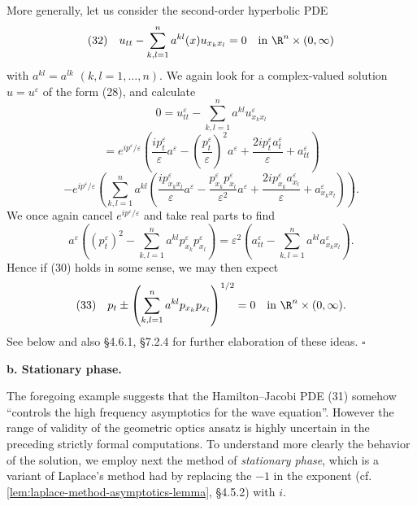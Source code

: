 \begin{example}
More generally, let us consider the second-order hyperbolic PDE
$$(32) \quad u_{tt} - \sum_{k,l=1}^n a^{kl}(x) u_{x_k x_l} = 0 \quad \text{in } \R^n \times (0,\infty)$$
with $a^{kl} = a^{lk}$ $(k, l = 1, \ldots, n)$. We again look for a complex-valued solution $u = u^\varepsilon$ of the form (28), and calculate
$$0 = u_{tt}^\varepsilon - \sum_{k,l=1}^n a^{kl} u_{x_k x_l}^\varepsilon$$
$$= e^{ip^\varepsilon/\varepsilon} \left( \frac{ip_t^\varepsilon}{\varepsilon} a^\varepsilon - \left( \frac{p_t^\varepsilon}{\varepsilon} \right)^2 a^\varepsilon + \frac{2ip_t^\varepsilon a_t^\varepsilon}{\varepsilon} + a_{tt}^\varepsilon \right)$$
$$- e^{ip^\varepsilon/\varepsilon} \left( \sum_{k,l=1}^n a^{kl} \left( \frac{ip_{x_k x_l}^\varepsilon}{\varepsilon} a^\varepsilon - \frac{p_{x_k}^\varepsilon p_{x_l}^\varepsilon}{\varepsilon^2} a^\varepsilon + \frac{2ip_{x_k}^\varepsilon a_{x_l}^\varepsilon}{\varepsilon} + a_{x_k x_l}^\varepsilon \right) \right).$$
We once again cancel $e^{ip^\varepsilon/\varepsilon}$ and take real parts to find
$$a^\varepsilon \left( (p_t^\varepsilon)^2 - \sum_{k,l=1}^n a^{kl} p_{x_k}^\varepsilon p_{x_l}^\varepsilon \right) = \varepsilon^2 \left( a_{tt}^\varepsilon - \sum_{k,l=1}^n a^{kl} a_{x_k x_l}^\varepsilon \right).$$
Hence if (30) holds in some sense, we may then expect
$$(33) \quad p_t \pm \left( \sum_{k,l=1}^n a^{kl} p_{x_k} p_{x_l} \right)^{1/2} = 0 \quad \text{in } \R^n \times (0, \infty).$$
See below and also \S4.6.1, \S7.2.4 for further elaboration of these ideas. $\square$
\end{example}

\textbf{b. Stationary phase.}

The foregoing example suggests that the Hamilton--Jacobi PDE (31) somehow ``controls the high frequency asymptotics for the wave equation''. However the range of validity of the geometric optics ansatz is highly uncertain in the preceding strictly formal computations. To understand more clearly the behavior of the solution, we employ next the method of \textit{stationary phase}, which is a variant of Laplace's method had by replacing the $-1$ in the exponent (cf. \cref{lem:laplace-method-asymptotics-lemma}, \S4.5.2) with $i$.

